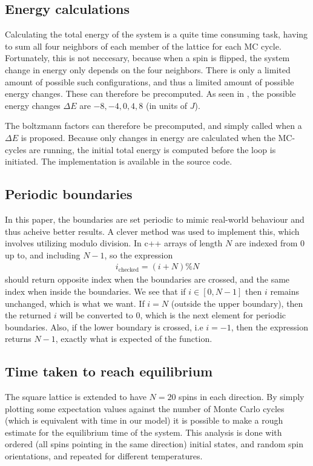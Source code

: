 \documentclass[aps,reprint]{revtex4-1}
\begin{document}
\subsection{Energy calculations}
Calculating the total energy of the system is a quite time consuming task, having
to sum all four neighbors of each member of the lattice for each MC cycle. Fortunately,
this is not neccesary, because when a spin is flipped, the system change in energy
only depends on the four neighbors. There is only a limited amount of possible
such configurations, and thus a limited amount of possible energy changes. These
can therefore be precomputed. As seen in \cite{mortenjensen}, the possible
energy changes $\Delta E$ are $-8, -4, 0, 4, 8$ (in units of $J$).

The boltzmann factors can therefore be precomputed, and simply called when a $\Delta E$
is proposed. Because only changes in energy are calculated when the MC-cycles
are running, the initial total energy is computed before the loop is initiated.
The implementation is available in the source code.
\subsection{Periodic boundaries}
In this paper, the boundaries are set periodic to mimic real-world behaviour and
thus acheive better results. A clever method was used to implement this, which
involves utilizing modulo division. In c++ arrays of length $N$ are indexed from
$0$ up to, and including $N-1$, so the expression
\begin{align*}
  i_\text{checked} = (i + N) \% N
\end{align*}
should return opposite index when the boundaries are crossed, and the same
index when inside the boundaries. We see that if $i \in [0, N-1]$ then $i$
remains unchanged, which is what we want. If $i = N$ (outside the upper boundary),
then the returned $i$ will be converted to $0$, which is the next element for
periodic boundaries. Also, if the lower boundary is crossed, i.e $i = -1$, then
the expression returns $N - 1$, exactly what is expected of the function.

\subsection{Time taken to reach equilibrium}
The square lattice is extended to have $N = 20$ spins in each direction. By simply
plotting some expectation values against the number of Monte Carlo cycles (which
is equivalent with time in our model) it is possible to make a rough estimate
for the equilibrium time of the system. This analysis is done with ordered
(all spins pointing in the same direction) initial states, and random
spin orientations, and repeated for different temperatures.
\end{document}

